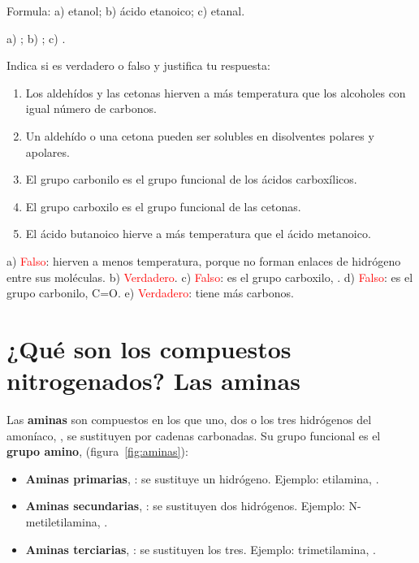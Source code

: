\begin{exercise}
    Formula: a) etanol; b) ácido etanoico; c) etanal.
    \begin{solu}
        a) \textcolor{red}{}; b) \textcolor{red}{}; c) \textcolor{red}{}.
    \end{solu}
\end{exercise}

\begin{exercise}
    Indica si es verdadero o falso y justifica tu respuesta:
    \begin{enumerate}[label=\alph*)]
        \item Los aldehídos y las cetonas hierven a más temperatura que los alcoholes con igual número de carbonos.
        \item Un aldehído o una cetona pueden ser solubles en disolventes polares y apolares.
        \item El grupo carbonilo es el grupo funcional de los ácidos carboxílicos.
        \item El grupo carboxilo es el grupo funcional de las cetonas.
        \item El ácido butanoico hierve a más temperatura que el ácido metanoico.
    \end{enumerate}
    \begin{solu}
        a) \textcolor{red}{Falso}: hierven a menos temperatura, porque no forman enlaces de hidrógeno entre sus moléculas. b) \textcolor{red}{Verdadero}. c) \textcolor{red}{Falso}: es el grupo carboxilo, . d) \textcolor{red}{Falso}: es el grupo carbonilo, C=O. e) \textcolor{red}{Verdadero}: tiene más carbonos.
    \end{solu}
\end{exercise}

\section[Las aminas]{¿Qué son los compuestos nitrogenados? Las aminas}

Las \textbf{aminas} son compuestos en los que uno, dos o los tres hidrógenos del amoníaco, , se sustituyen por cadenas carbonadas. Su grupo funcional es el \textbf{grupo amino},  (figura~\ref{fig:aminas}):
\begin{itemize}
    \item \textbf{Aminas primarias}, : se sustituye un hidrógeno. Ejemplo: etilamina, .
    \item \textbf{Aminas secundarias}, : se sustituyen dos hidrógenos. Ejemplo: N-metiletilamina, .
    \item \textbf{Aminas terciarias}, : se sustituyen los tres. Ejemplo: trimetilamina, .
\end{itemize}

